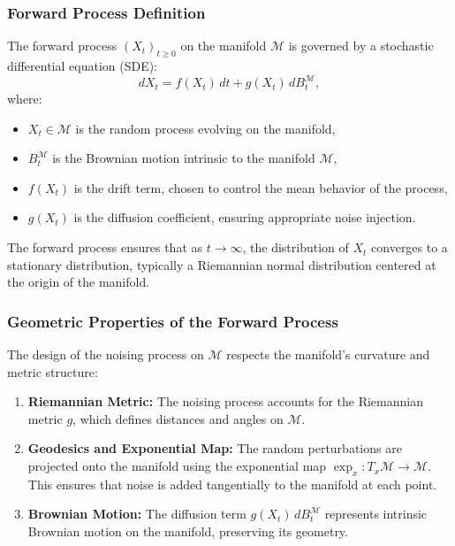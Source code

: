\documentclass[a4paper,14pt]{article}
\renewcommand{\geq}{\ensuremath{\geqslant}}
\theoremstyle{plain} %
\theoremstyle{definition} %
\theoremstyle{remark} %
\theoremstyle{definition}
\theoremstyle{remark}
\theoremstyle{remark}
\begin{document}
	\subsubsection{Forward Process Definition}
	
	The forward process \( (X_t)_{t \geq 0} \) on the manifold \( \mathcal{M} \) is governed by a stochastic differential equation (SDE):
	\[
	dX_t = f(X_t) \, dt + g(X_t) \, dB_t^\mathcal{M},
	\]
	where:
	\begin{itemize}
		\item \( X_t \in \mathcal{M} \) is the random process evolving on the manifold,
		\item \( B_t^\mathcal{M} \) is the Brownian motion intrinsic to the manifold \( \mathcal{M} \),
		\item \( f(X_t) \) is the drift term, chosen to control the mean behavior of the process,
		\item \( g(X_t) \) is the diffusion coefficient, ensuring appropriate noise injection.
	\end{itemize}
	
	The forward process ensures that as \( t \to \infty \), the distribution of \( X_t \) converges to a stationary distribution, typically a Riemannian normal distribution centered at the origin of the manifold.
	
	\subsubsection{Geometric Properties of the Forward Process}
	
	The design of the noising process on \( \mathcal{M} \) respects the manifold's curvature and metric structure:
	\begin{enumerate}
		\item \textbf{Riemannian Metric:} The noising process accounts for the Riemannian metric \( g \), which defines distances and angles on \( \mathcal{M} \).
		\item \textbf{Geodesics and Exponential Map:} The random perturbations are projected onto the manifold using the exponential map \( \exp_x: T_x\mathcal{M} \to \mathcal{M} \). This ensures that noise is added tangentially to the manifold at each point.
		\item \textbf{Brownian Motion:} The diffusion term \( g(X_t) \, dB_t^\mathcal{M} \) represents intrinsic Brownian motion on the manifold, preserving its geometry.
	\end{enumerate}
	
\end{document}
